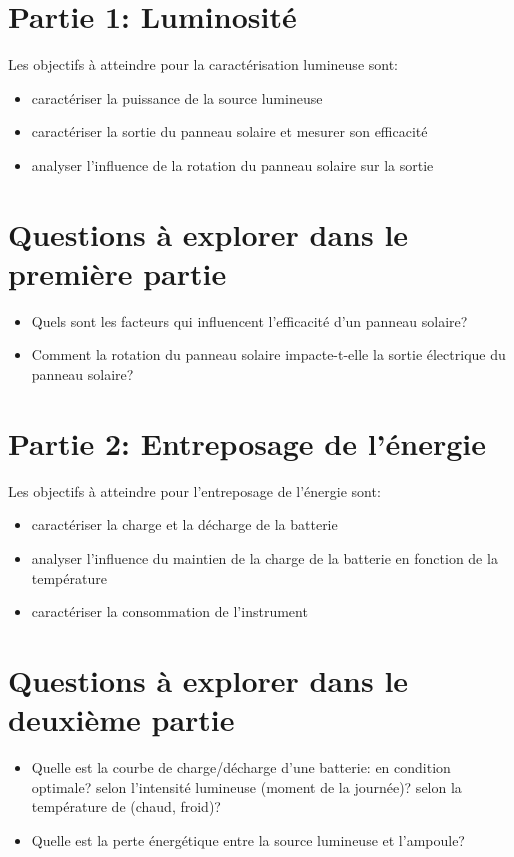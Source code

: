 \documentclass[canadien,12pt,oneside,letterpaper]{article}
\begin{document}
\section{Partie 1: Luminosité}\label{sec:partie1}
\vspace{-2ex}
Les objectifs à atteindre pour la caractérisation lumineuse sont:
\begin{itemize}
\item caractériser la puissance de la source lumineuse
\item caractériser la sortie du panneau solaire et mesurer son efficacité
\item analyser l'influence de la rotation du panneau solaire sur la sortie
\end{itemize}


\section{Questions à explorer dans le première partie}
\begin{itemize}
\item Quels sont les facteurs qui influencent l'efficacité d'un panneau solaire?
\item Comment la rotation du panneau solaire impacte-t-elle la sortie électrique du panneau solaire?
\end{itemize}

\section{Partie 2: Entreposage de l'énergie}\label{sec:partie2}
\vspace{-2ex}
Les objectifs à atteindre pour l'entreposage de l'énergie sont:
\begin{itemize}
\item caractériser la charge et la décharge de la batterie
\item analyser l'influence du maintien de la charge de la batterie en fonction de la température
\item caractériser la consommation de l'instrument
\end{itemize}

\section{Questions à explorer dans le deuxième partie}
\begin{itemize}
\item Quelle est la courbe de charge/décharge d'une batterie: en condition optimale? selon l'intensité lumineuse (moment de la journée)? selon la température de (chaud, froid)?
\item Quelle est la perte énergétique entre la source lumineuse et l'ampoule? 
\end{itemize}
\end{document}
